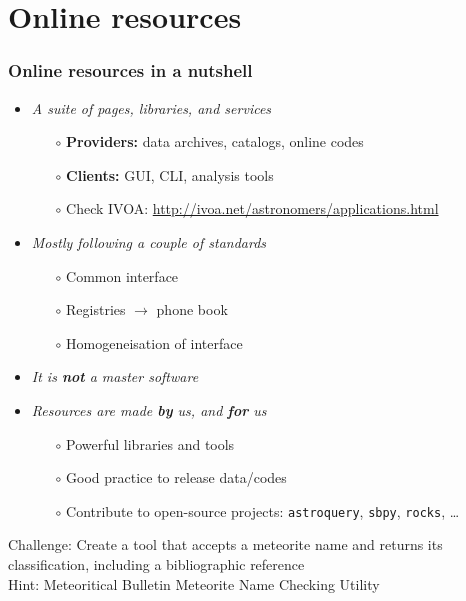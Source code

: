 \section{Online resources}

\begin{frame}
  \frametitle{Online resources in a nutshell}

  \begin{itemize}[<+->]
    \item \emph{A suite of pages, libraries, and services}
      \begin{itemize}[<.->]
        \item[$\circ$] \textbf{Providers:} data archives, catalogs, online codes
        \item[$\circ$] \textbf{Clients:} GUI, CLI, analysis tools
        \item[$\circ$] Check IVOA: \url{http://ivoa.net/astronomers/applications.html}
      \end{itemize}

    \vspace{1em}
    \item \emph{Mostly following a couple of standards}
      \begin{itemize}[<.->]
        \item[$\circ$] Common interface 
        \item[$\circ$] Registries $\rightarrow$ phone book
        \item[$\circ$] Homogeneisation of interface 
      \end{itemize}

    \vspace{1em}
    \item \emph{It is \textbf{not} a master software}

    \vspace{1em}
    \item \emph{Resources are made \textbf{by} us, and \textbf{for} us}
      \begin{itemize}[<.->]
        \item[$\circ$] Powerful libraries and tools
        \item[$\circ$] Good practice to release data/codes 
        \item[$\circ$] Contribute to open-source projects: \texttt{astroquery}, \texttt{sbpy}, \texttt{rocks}, \dots
      \end{itemize}

  \end{itemize}

\end{frame}

\begin{frame}[t]{}
    Challenge: Create a tool that accepts a meteorite name and returns its classification, including a bibliographic reference\\
    Hint: Meteoritical Bulletin Meteorite Name Checking Utility
\end{frame}
